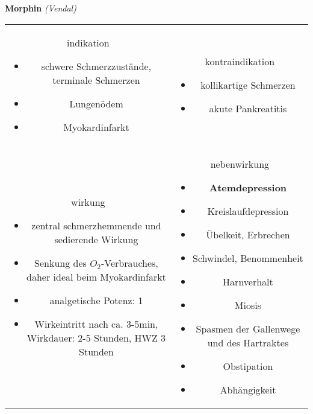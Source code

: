 \begin{frame}{
    \textbf{Morphin}
    \textit{(Vendal)}
}
    \begin{tabular}{c c}
        \begin{beamercolorbox}[wd=\boxwidth\textwidth,ht=\boxheight\textheight,sep=1em]{indikation}
            \begin{itemize}
                \item schwere Schmerzzustände, terminale Schmerzen
                \item Lungenödem
                \item Myokardinfarkt
            \end{itemize}
        \end{beamercolorbox} & 
        \begin{beamercolorbox}[wd=\boxwidth\textwidth,ht=\boxheight\textheight,sep=1em]{kontraindikation}
            \begin{itemize}
                \item kollikartige Schmerzen
                \item akute Pankreatitis
            \end{itemize}
        \end{beamercolorbox} \\
        \begin{beamercolorbox}[wd=\boxwidth\textwidth,ht=\boxheight\textheight,sep=1em]{wirkung}
            \begin{itemize}
                \item zentral schmerzhemmende und sedierende Wirkung
                \item Senkung des $O_2$-Verbrauches, daher ideal beim Myokardinfarkt
                \item analgetische Potenz: 1
                \item Wirkeintritt nach ca. 3-5min, Wirkdauer: 2-5 Stunden, HWZ 3 Stunden
            \end{itemize}
        \end{beamercolorbox} & 
        \begin{beamercolorbox}[wd=\boxwidth\textwidth,ht=\boxheight\textheight,sep=1em]{nebenwirkung}
            \begin{itemize}
                \item \textbf{Atemdepression}
                \item Kreislaufdepression
                \item Übelkeit, Erbrechen
                \item Schwindel, Benommenheit
                \item Harnverhalt
                \item Miosis
                \item Spasmen der Gallenwege und des Hartraktes
                \item Obstipation
                \item Abhängigkeit
            \end{itemize}
        \end{beamercolorbox} \\
    \end{tabular}
\end{frame}

